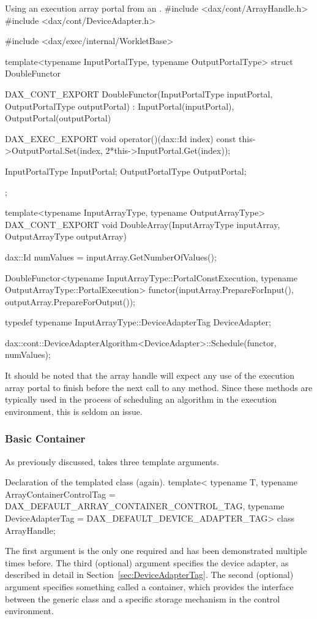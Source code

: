 \begin{daxexample}{Using an execution array portal from an .}
#include <dax/cont/ArrayHandle.h>
#include <dax/cont/DeviceAdapter.h>

#include <dax/exec/internal/WorkletBase>

template<typename InputPortalType, typename OutputPortalType>
struct DoubleFunctor
{
  DAX_CONT_EXPORT
  DoubleFunctor(InputPortalType inputPortal, OutputPortalType outputPortal)
    : InputPortal(inputPortal), OutputPortal(outputPortal) {  }

  DAX_EXEC_EXPORT
  void operator()(dax::Id index) const {
    this->OutputPortal.Set(index, 2*this->InputPortal.Get(index));
  }

  InputPortalType InputPortal;
  OutputPortalType OutputPortal;
};

template<typename InputArrayType, typename OutputArrayType>
DAX_CONT_EXPORT
void DoubleArray(InputArrayType inputArray, OutputArrayType outputArray)
{
  dax::Id numValues = inputArray.GetNumberOfValues();

  DoubleFunctor<typename InputArrayType::PortalConstExecution,
                typename OutputArrayType::PortalExecution>
    functor(inputArray.PrepareForInput(),
            outputArray.PrepareForOutput());

  typedef typename InputArrayType::DeviceAdapterTag DeviceAdapter;

  dax::cont::DeviceAdapterAlgorithm<DeviceAdapter>::Schedule(functor, numValues);
}
\end{daxexample}

It should be noted that the array handle will expect any use of the
execution array portal to finish before the next call to any
 method. Since these  methods
are typically used in the process of scheduling an algorithm in the
execution environment, this is seldom an issue.

\subsubsection{Basic Container}


As previously discussed,  takes three template
arguments.
\begin{daxexample}{Declaration of the \protect{} templated class (again).}
template<
    typename T,
    typename ArrayContainerControlTag = DAX_DEFAULT_ARRAY_CONTAINER_CONTROL_TAG,
    typename DeviceAdapterTag = DAX_DEFAULT_DEVICE_ADAPTER_TAG>
class ArrayHandle;
\end{daxexample}
The first argument is the only one required and has been demonstrated
multiple times before. The third (optional) argument specifies the device
adapter, as described in detail in Section~\ref{sec:DeviceAdapterTag}. The
second (optional) argument specifies something called a container, which
provides the interface between the generic  class and
a specific storage mechanism in the control environment.

